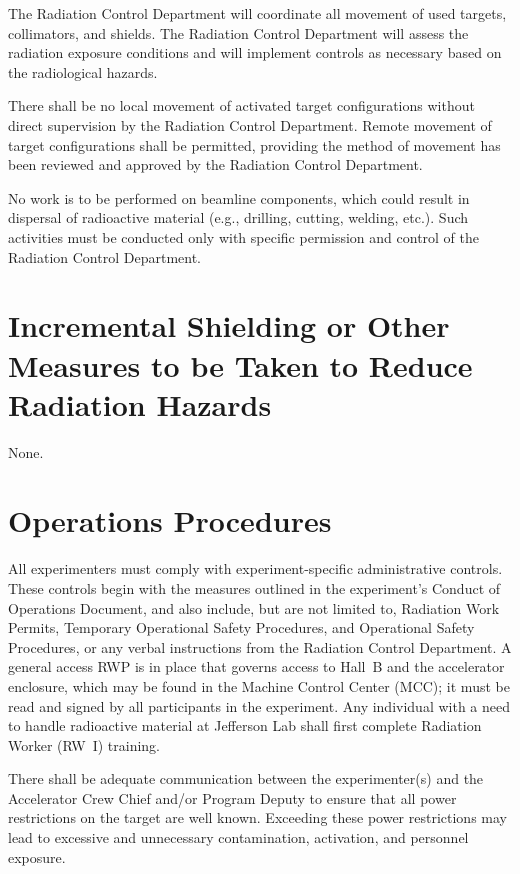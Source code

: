 \documentclass [12pt]{article}
\begin{document}
The Radiation Control Department will coordinate all movement of used targets, collimators, and 
shields. The Radiation Control Department will assess the radiation exposure conditions and will 
implement controls as necessary based on the radiological hazards. 

There shall be no local movement of activated target configurations without direct supervision by 
the Radiation Control Department. Remote movement of target configurations shall be permitted, 
providing the method of movement has been reviewed and approved by the Radiation Control Department. 

No work is to be performed on beamline components, which could result in dispersal of radioactive 
material (e.g., drilling, cutting, welding, etc.). Such activities must be conducted only with 
specific permission and control of the Radiation Control Department. 

\section{Incremental Shielding or Other Measures to be Taken to Reduce Radiation Hazards} 

None.

\section{Operations Procedures}

All experimenters must comply with experiment-specific administrative controls. These controls 
begin with the measures outlined in the experiment's Conduct of Operations Document, and also 
include, but are not limited to, Radiation Work Permits, Temporary Operational Safety Procedures, 
and Operational Safety Procedures, or any verbal instructions from the Radiation Control 
Department. A general access RWP is in place that governs access to Hall~B and the accelerator 
enclosure, which may be found in the Machine Control Center (MCC); it must be read and signed by 
all participants in the experiment. Any individual with a need to handle radioactive material at 
Jefferson Lab shall first complete Radiation Worker (RW~I) training.

There shall be adequate communication between the experimenter(s) and the Accelerator Crew Chief 
and/or Program Deputy to ensure that all power restrictions on the target are well known. Exceeding 
these power restrictions may lead to excessive and unnecessary contamination, activation, and 
personnel exposure. 
\end{document}
